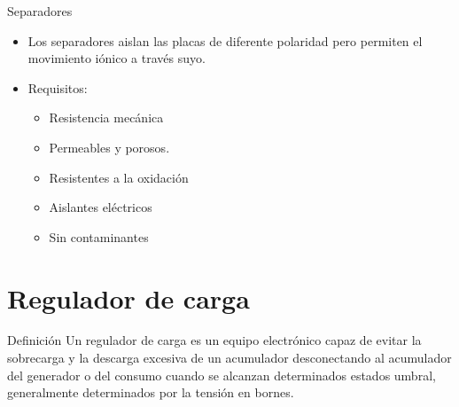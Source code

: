 \documentclass[xcolor={usenames,svgnames,dvipsnames}]{beamer}
\begin{document}
\begin{frame}[label={sec:org75766e8}]{Separadores}
\begin{itemize}
\item Los separadores \alert{aislan las placas de diferente polaridad pero
permiten el movimiento iónico a través suyo}.
\item Requisitos:
\begin{itemize}
\item Resistencia mecánica
\item Permeables y porosos.
\item Resistentes a la oxidación
\item Aislantes eléctricos
\item Sin contaminantes
\end{itemize}
\end{itemize}
\end{frame}

\section{Regulador de carga}
\label{sec:orge2b2d73}

\begin{frame}[label={sec:org68e0a3a}]{Definición}
Un regulador de carga es un equipo electrónico capaz de \alert{evitar la sobrecarga y la descarga excesiva de un acumulador} desconectando al acumulador del generador o del consumo \alert{cuando se alcanzan determinados estados umbral, generalmente determinados por la tensión en bornes}.
\end{frame}
\end{document}
